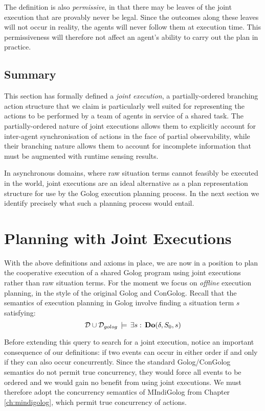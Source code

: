 The definition is also \emph{permissive}, in that there may be leaves
of the joint execution that are provably never be legal. Since the
outcomes along these leaves will not occur in reality, the agents
will never follow them at execution time. This permissiveness will
therefore not affect an agent's ability to carry out the plan in practice.


\subsection{Summary}

This section has formally defined a \emph{joint execution}, a partially-ordered
branching action structure that we claim is particularly well suited
for representing the actions to be performed by a team of agents in
service of a shared task. The partially-ordered nature of joint executions
allows them to explicitly account for inter-agent synchronisation
of actions in the face of partial observability, while their branching
nature allows them to account for incomplete information that must
be augmented with runtime sensing results.

In asynchronous domains, where raw situation terms cannot feasibly
be executed in the world, joint executions are an ideal alternative
as a plan representation structure for use by the Golog execution
planning process. In the next section we identify precisely what such
a planning process would entail.


\section{Planning with Joint Executions\label{sec:JointExec:Planning}}

With the above definitions and axioms in place, we are now in a position
to plan the cooperative execution of a shared Golog program using
joint executions rather than raw situation terms. For the moment we
focus on \emph{offline} execution planning, in the style of the original
Golog and ConGolog. Recall that the semantics of execution planning
in Golog involve finding a situation term $s$ satisfying:\[
\mathcal{D}\cup\mathcal{D}_{golog}\,\models\,\exists s:\,\mathbf{Do}(\delta,S_{0},s)\]


Before extending this query to search for a joint execution, notice
an important consequence of our definitions: if two events can occur
in either order if and only if they can also occur concurrently. Since
the standard Golog/ConGolog semantics do not permit true concurrency,
they would force all events to be ordered and we would gain no benefit
from using joint executions. We must therefore adopt the concurrency
semantics of MIndiGolog from Chapter \ref{ch:mindigolog}, which permit
true concurrency of actions.

